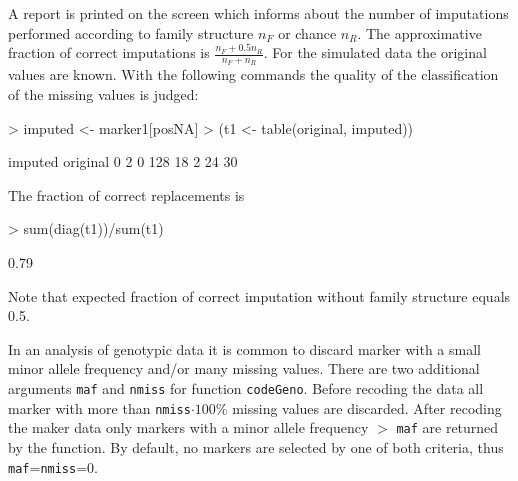 \documentclass[a4paper,11pt]{article}
\begin{document}
A report is printed on the screen which informs about the number of imputations performed according to family structure $n_F$ or chance $n_R$. The approximative fraction of correct imputations is $\frac{n_F + 0.5n_R}{n_F+n_R}$. For the simulated data the 
original values are known. With the following commands the quality of the classification of the missing values is judged: 
\begin{Schunk}
\begin{Sinput}
> imputed <- marker1[posNA]
> (t1 <- table(original, imputed))
\end{Sinput}
\begin{Soutput}
        imputed
original   0   2
       0 128  18
       2  24  30
\end{Soutput}
\end{Schunk}
The fraction of correct replacements is
\begin{Schunk}
\begin{Sinput}
> sum(diag(t1))/sum(t1)
\end{Sinput}
\begin{Soutput}
[1] 0.79
\end{Soutput}
\end{Schunk}
Note that expected fraction of correct imputation without family structure equals 0.5.

In an analysis of genotypic data it is common to discard marker with a small minor allele frequency and/or many missing values. 
There are two additional arguments \texttt{maf} and \texttt{nmiss} for function \texttt{codeGeno}. 
Before recoding the data all marker with more than
\texttt{nmiss}$\cdot 100\%$ missing values are discarded. 
After recoding the maker data only markers with a minor allele frequency $>$ \texttt{maf} are returned by the function. 
By default, no markers are selected by one of both criteria, thus \texttt{maf}=\texttt{nmiss}=0.
                                       
\end{document}
